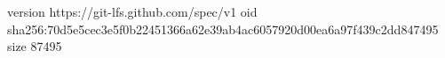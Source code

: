 version https://git-lfs.github.com/spec/v1
oid sha256:70d5e5cec3e5f0b22451366a62e39ab4ac6057920d00ea6a97f439c2dd847495
size 87495
